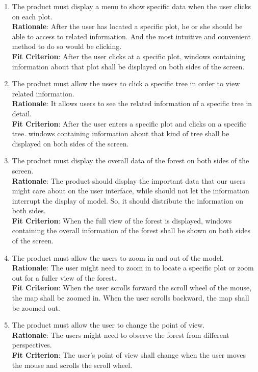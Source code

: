 \documentclass{article}
\begin{document}
\begin{enumerate}[FR1]
	\item The product must display a menu to show specific data when the user clicks on each plot.\\
	\textbf{Rationale}: After the user has located a specific plot, he or she should be able to access to related information. And the most intuitive and convenient method to do so would be clicking. \\
	\textbf{Fit Criterion}: After the user clicks at a specific plot, windows containing information about that plot shall be displayed on both sides of the screen.
	
	\item The product must allow the users to click a specific tree in order to view related information.\\
	\textbf{Rationale}: It allows users to see the related information of a specific tree in detail.\\
	\textbf{Fit Criterion}: After the user enters a specific plot and clicks on a specific tree. windows containing information about that kind of tree shall be displayed on both sides of the screen. 
	
	\item The product must display the overall data of the forest on both sides of the screen.\\
	\textbf{Rationale}: The product should display the important data that our users might care about on the user interface, while should not let the information interrupt the display of model. So, it should distribute the information on both sides.\\
	\textbf{Fit Criterion}: When the full view of the forest is displayed, windows containing the overall information of the forest shall be shown on both sides of the screen. 
	
	\item The product must allow the users to zoom in and out of the model.\\
	\textbf{Rationale}: The user might need to zoom in to locate a specific plot or zoom out for a fuller view of the forest. \\
	\textbf{Fit Criterion}: When the user scrolls forward the scroll wheel of the mouse, the map shall be zoomed in. When the user scrolls backward, the map shall be zoomed out. 
	
	\item The product must allow the user to change the point of view. \\
	\textbf{Rationale}: The users might need to observe the forest from different perspectives.\\
	\textbf{Fit Criterion}: The user's point of view shall change when the user moves the mouse and scrolls the scroll wheel.
	

\end{enumerate}
\end{document}
